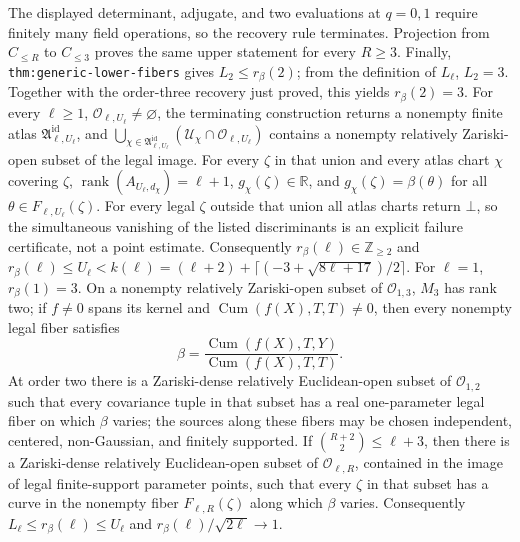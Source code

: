 The displayed determinant, adjugate, and two evaluations at \(q=0,1\) require finitely many field operations, so the recovery rule terminates.  Projection from \(C_{\le R}\) to \(C_{\le3}\) proves the same upper statement for every \(R\ge3\).  Finally, \texttt{thm:generic-lower-fibers} gives \(L_2\le r_\beta(2)\); from the definition of \(L_\ell\), \(L_2=3\).  Together with the order-three recovery just proved, this yields \(r_\beta(2)=3\).
For every \(\ell\ge1\), \(\mathcal O_{\ell,U_{\ell}}\ne\varnothing\), the terminating construction returns a nonempty finite atlas \(\mathfrak A^{\mathrm{id}}_{\ell,U_{\ell}}\), and \(\bigcup_{\chi\in\mathfrak A^{\mathrm{id}}_{\ell,U_{\ell}}}(\mathcal U_{\chi}\cap\mathcal O_{\ell,U_{\ell}})\) contains a nonempty relatively Zariski-open subset of the legal image. For every \(\zeta\) in that union and every atlas chart \(\chi\) covering \(\zeta\), \(\operatorname{rank}(A_{U_{\ell},d_{\chi}})=\ell+1\), \(g_{\chi}(\zeta)\in\mathbb R\), and \(g_{\chi}(\zeta)=\beta(\theta)\) for all \(\theta\in F_{\ell,U_{\ell}}(\zeta)\). For every legal \(\zeta\) outside that union all atlas charts return \(\bot\), so the simultaneous vanishing of the listed discriminants is an explicit failure certificate, not a point estimate. Consequently \(r_{\beta}(\ell)\in\mathbb Z_{\ge2}\) and \(r_{\beta}(\ell)\le U_{\ell}<k(\ell)=(\ell+2)+\lceil(-3+\sqrt{8\ell+17})/2\rceil\).
For \(\ell=1\), \(r_\beta(1)=3\).  On a nonempty relatively Zariski-open subset of \(\mathcal O_{1,3}\), \(M_3\) has rank two; if \(f\ne0\) spans its kernel and \(\operatorname{Cum}(f(X),T,T)\ne0\), then every nonempty legal fiber satisfies
\[
 \beta=\frac{\operatorname{Cum}(f(X),T,Y)}{\operatorname{Cum}(f(X),T,T)}.
\]
At order two there is a Zariski-dense relatively Euclidean-open subset of \(\mathcal O_{1,2}\) such that every covariance tuple in that subset has a real one-parameter legal fiber on which \(\beta\) varies; the sources along these fibers may be chosen independent, centered, non-Gaussian, and finitely supported.
If \(\binom{R+2}{2}\le\ell+3\), then there is a Zariski-dense relatively Euclidean-open subset of \(\mathcal O_{\ell,R}\), contained in the image of legal finite-support parameter points, such that every \(\zeta\) in that subset has a curve in the nonempty fiber \(F_{\ell,R}(\zeta)\) along which \(\beta\) varies. Consequently \(L_{\ell}\le r_{\beta}(\ell)\le U_{\ell}\) and \(r_{\beta}(\ell)/\sqrt{2\ell}\to1\).
